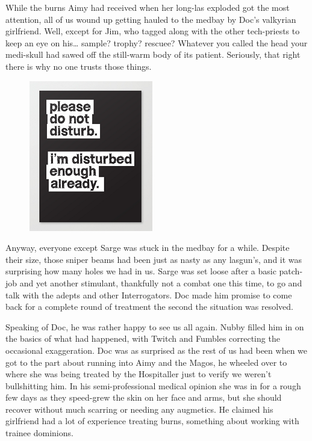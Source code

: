 While the burns Aimy had received when her long-las exploded got the most attention, all of us wound up getting hauled to the medbay by Doc's valkyrian girlfriend. 
Well, except for Jim, who tagged along with the other tech-priests to keep an eye on his… sample? 
trophy? 
rescuee? 
Whatever you called the head your medi-skull had sawed off the still-warm body of its patient. 
Seriously, that right there is why no one trusts those things.

\begin{figure}
	\begin{center}
		\includegraphics[width=\figwidth]{pics/11/30.png}
	\end{center}
\end{figure}
Anyway, everyone except Sarge was stuck in the medbay for a while. 
Despite their size, those sniper beams had been just as nasty as any lasgun's, and it was surprising how many holes we had in us. 
Sarge was set loose after a basic patch-job and yet another stimulant, thankfully not a combat one this time, to go and talk with the adepts and other Interrogators. 
Doc made him promise to come back for a complete round of treatment the second the situation was resolved.

Speaking of Doc, he was rather happy to see us all again. 
Nubby filled him in on the basics of what had happened, with Twitch and Fumbles correcting the occasional exaggeration. 
Doc was as surprised as the rest of us had been when we got to the part about running into Aimy and the Magos, he wheeled over to where she was being treated by the Hospitaller just to verify we weren't bullshitting him. 
In his semi-professional medical opinion she was in for a rough few days as they speed-grew the skin on her face and arms, but she should recover without much scarring or needing any augmetics. 
He claimed his girlfriend had a lot of experience treating burns, something about working with trainee dominions.

